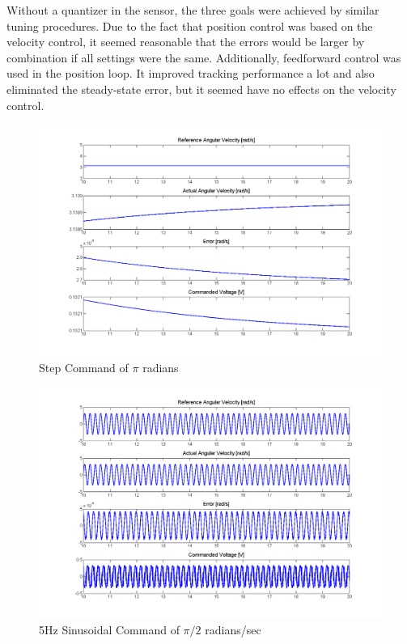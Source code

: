 \documentclass{article}
\theoremstyle{plain}
\theoremstyle{definition}
\theoremstyle{remark}
\begin{document}
Without a quantizer in the sensor, the three goals were achieved by similar tuning procedures. Due to the fact that position control was based on the velocity control, it seemed reasonable that the errors would be larger by combination if all settings were the same. Additionally, feedforward control was used in the position loop. It improved tracking performance a lot and also eliminated the steady-state error, but it seemed have no effects on the velocity control.  

\begin{figure}[htb]
\begin{center}
\includegraphics[width = 14 cm]{q3_18}
\caption{Step Command of $\pi$ radians}
\label{q3_18}
\end{center}
\end{figure}

\begin{figure}[htb]
\begin{center}
\includegraphics[width = 14 cm]{q3_19}
\caption{5Hz Sinusoidal Command of $\pi/2$ radians/sec}
\label{q3_19}
\end{center}
\end{figure}
\end{document}
